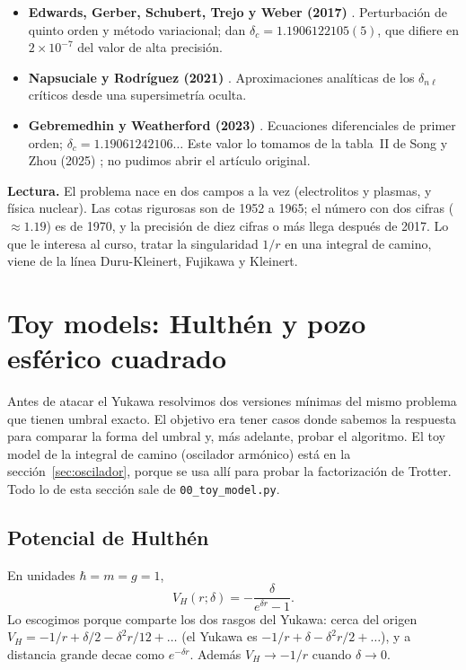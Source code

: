 \documentclass[11pt]{article}
\newcommand{\dc}{\delta_c}
\begin{document}
\begin{itemize}
\item \textbf{Edwards, Gerber, Schubert, Trejo y Weber (2017)} \cite{Edwards2017}. Perturbación de quinto orden y método variacional; dan $\dc=1.1906122105(5)$, que difiere en $2\times10^{-7}$ del valor de alta precisión.
\item \textbf{Napsuciale y Rodríguez (2021)} \cite{Napsuciale2021}. Aproximaciones analíticas de los $\delta_{n\ell}$ críticos desde una supersimetría oculta.
\item \textbf{Gebremedhin y Weatherford (2023)} \cite{Gebremedhin2023}. Ecuaciones diferenciales de primer orden; $\dc=1.19061242106\ldots$ Este valor lo tomamos de la tabla~II de Song y Zhou (2025) \cite{Song2025}; no pudimos abrir el artículo original.
\end{itemize}

\textbf{Lectura.} El problema nace en dos campos a la vez (electrolitos y plasmas, y física nuclear). Las cotas rigurosas son de 1952 a 1965; el número con dos cifras ($\approx1.19$) es de 1970, y la precisión de diez cifras o más llega después de 2017. Lo que le interesa al curso, tratar la singularidad $1/r$ en una integral de camino, viene de la línea Duru-Kleinert, Fujikawa y Kleinert.

\section{Toy models: Hulthén y pozo esférico cuadrado}
\label{sec:toy}

Antes de atacar el Yukawa resolvimos dos versiones mínimas del mismo problema que tienen umbral exacto. El objetivo era tener casos donde sabemos la respuesta para comparar la forma del umbral y, más adelante, probar el algoritmo. El toy model de la integral de camino (oscilador armónico) está en la sección~\ref{sec:oscilador}, porque se usa allí para probar la factorización de Trotter. Todo lo de esta sección sale de \texttt{00\_toy\_model.py}.

\subsection{Potencial de Hulthén}

En unidades $\hbar=m=g=1$,
\[
V_H(r;\delta)=-\frac{\delta}{e^{\delta r}-1}.
\]
Lo escogimos porque comparte los dos rasgos del Yukawa: cerca del origen $V_H=-1/r+\delta/2-\delta^2r/12+\dots$ (el Yukawa es $-1/r+\delta-\delta^2r/2+\dots$), y a distancia grande decae como $e^{-\delta r}$. Además $V_H\to-1/r$ cuando $\delta\to0$.
\end{document}
